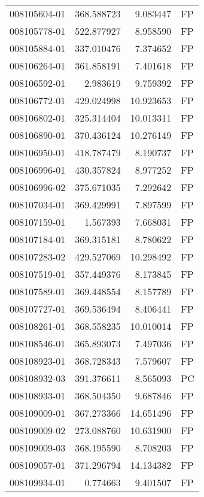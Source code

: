 \begin{tabular}{lrrl}
008105604-01 &  368.588723 &       9.083447 &   FP \\
008105778-01 &  522.877927 &       8.958590 &   FP \\
008105884-01 &  337.010476 &       7.374652 &   FP \\
008106264-01 &  361.858191 &       7.401618 &   FP \\
008106592-01 &    2.983619 &       9.759392 &   FP \\
008106772-01 &  429.024998 &      10.923653 &   FP \\
008106802-01 &  325.314404 &      10.013311 &   FP \\
008106890-01 &  370.436124 &      10.276149 &   FP \\
008106950-01 &  418.787479 &       8.190737 &   FP \\
008106996-01 &  430.357824 &       8.977252 &   FP \\
008106996-02 &  375.671035 &       7.292642 &   FP \\
008107034-01 &  369.429991 &       7.897599 &   FP \\
008107159-01 &    1.567393 &       7.668031 &   FP \\
008107184-01 &  369.315181 &       8.780622 &   FP \\
008107283-02 &  429.527069 &      10.298492 &   FP \\
008107519-01 &  357.449376 &       8.173845 &   FP \\
008107589-01 &  369.448554 &       8.157789 &   FP \\
008107727-01 &  369.536494 &       8.406441 &   FP \\
008108261-01 &  368.558235 &      10.010014 &   FP \\
008108546-01 &  365.893073 &       7.497036 &   FP \\
008108923-01 &  368.728343 &       7.579607 &   FP \\
008108932-03 &  391.376611 &       8.565093 &   PC \\
008108933-01 &  368.504350 &       9.687846 &   FP \\
008109009-01 &  367.273366 &      14.651496 &   FP \\
008109009-02 &  273.088760 &      10.631900 &   FP \\
008109009-03 &  368.195590 &       8.708203 &   FP \\
008109057-01 &  371.296794 &      14.134382 &   FP \\
008109934-01 &    0.774663 &       9.401507 &   FP \\

\end{tabular}

